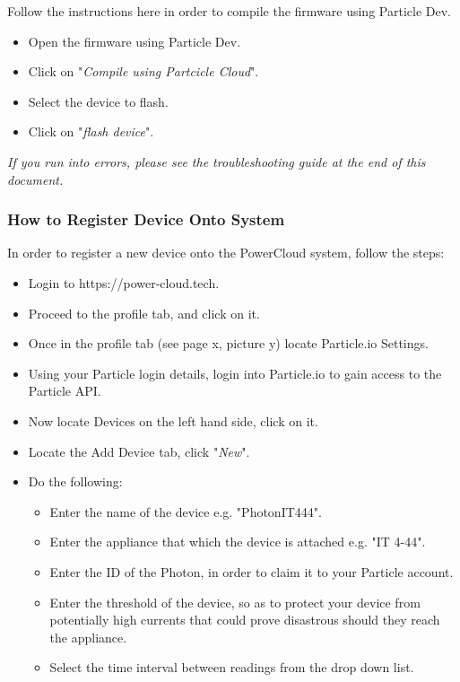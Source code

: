 \documentclass[a4paper,10pt]{article}
\begin{document}
	
			Follow the instructions here in order to compile the firmware using Particle 
			Dev.
			\\
			\begin{itemize}
				\item Open the firmware using Particle Dev.
				\item Click on "\textit{Compile using Partcicle Cloud}".
				\item Select the device to flash.
				\item Click on "\textit{flash device}".
			\end{itemize}
			
			\textit{If you run into errors, please see the troubleshooting guide at the end of this document.}
		\subsubsection{How to Register Device Onto System}
			In order to register a new device onto the PowerCloud system, follow the steps:
			
			\begin{itemize}
				\item Login to https://power-cloud.tech.
				\item Proceed to the profile tab, and click on it.
				\item Once in the profile tab (see page x, picture y) locate Particle.io Settings.
				\item Using your Particle login details, login into Particle.io to gain access to the Particle API.
				\item Now locate Devices on the left hand side, click on it.
				\item Locate the Add Device tab, click "\textit{New}".
				\item Do the following:
				\begin{itemize}
					\item Enter the name of the device e.g. "PhotonIT444".
					\item Enter the appliance that which the device is attached e.g. "IT 4-44".
					\item Enter the ID of the Photon, in order to claim it to your Particle account.
					\item Enter the threshold of the device, so as to protect your device from potentially high currents that could prove disastrous should they reach the appliance.
					\item Select the time interval between readings from the drop down list.
				\end{itemize}
			\end{itemize}
				
\end{document}
